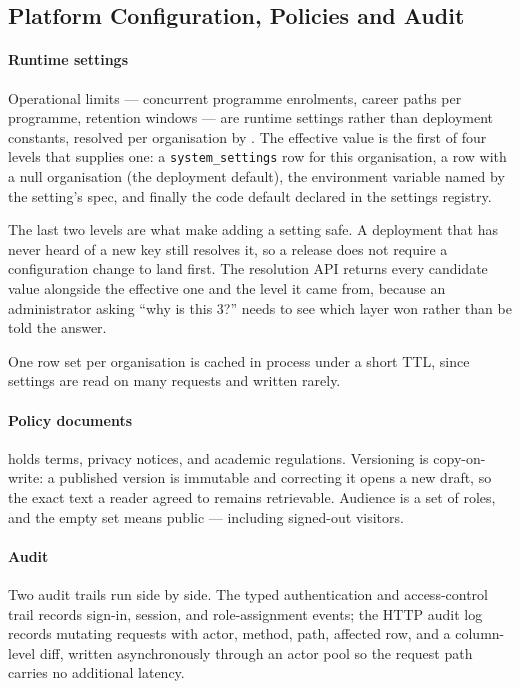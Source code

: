 \subsection{Platform Configuration, Policies and Audit}
\label{sec:impl_configuration}

\paragraph{Runtime settings}
Operational limits --- concurrent programme enrolments, career paths per programme, retention windows --- are runtime settings rather than deployment constants, resolved per organisation by . The effective value is the first of four levels that supplies one: a \texttt{system\_settings} row for this organisation, a row with a null organisation (the deployment default), the environment variable named by the setting's spec, and finally the code default declared in the settings registry.

The last two levels are what make adding a setting safe. A deployment that has never heard of a new key still resolves it, so a release does not require a configuration change to land first. The resolution API returns every candidate value alongside the effective one and the level it came from, because an administrator asking ``why is this 3?'' needs to see which layer won rather than be told the answer.

One row set per organisation is cached in process under a short TTL, since settings are read on many requests and written rarely.

\paragraph{Policy documents}
 holds terms, privacy notices, and academic regulations. Versioning is copy-on-write: a published version is immutable and correcting it opens a new draft, so the exact text a reader agreed to remains retrievable. Audience is a set of roles, and the empty set means public --- including signed-out visitors.

\paragraph{Audit}
Two audit trails run side by side. The typed authentication and access-control trail records sign-in, session, and role-assignment events; the HTTP audit log records mutating requests with actor, method, path, affected row, and a column-level diff, written asynchronously through an actor pool so the request path carries no additional latency.

